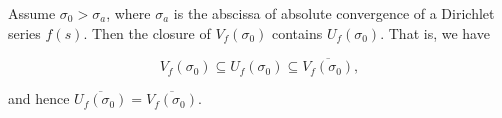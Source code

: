Assume $\sigma_0 > \sigma_a$, where $\sigma_a$ is the abscissa of absolute convergence of a Dirichlet series $f(s)$. Then the closure of $V_f(\sigma_0)$ contains $U_f(\sigma_0)$. That is, we have

$$V_f(\sigma_0) \subseteq U_f(\sigma_0) \subseteq \overline{V_f(\sigma_0)},$$

and hence $\overline{U_f(\sigma_0)} = \overline{V_f(\sigma_0)}$.
